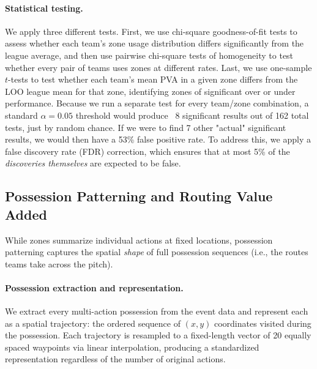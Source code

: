 \documentclass[12pt,a4paper]{article}
\begin{document}
\paragraph{Statistical testing.}
We apply three different tests. First, we use chi-square goodness-of-fit tests to assess whether each team’s zone usage distribution differs significantly from the league average, and then use pairwise chi-square tests of homogeneity to test whether every pair of teams uses zones at different rates. Last, we use one-sample $t$-tests to test whether each team’s mean PVA in a given zone differs from the LOO league mean for that zone, identifying zones of significant over or under performance. Because we run a separate test for every team/zone combination, a standard $\alpha = 0.05$ threshold would produce ~8 significant results out of 162 total tests, just by random chance. If we were to find 7 other "actual" significant results, we would then have a 53\% false positive rate. To address this, we apply a false discovery rate (FDR) correction, which ensures that at most 5\% of the \emph{discoveries themselves} are expected to be false.

\subsection{Possession Patterning and Routing Value Added}
While zones summarize individual actions at fixed locations, possession patterning captures the spatial \emph{shape} of full possession sequences (i.e., the routes teams take across the pitch).

\paragraph{Possession extraction and representation.}
We extract every multi-action possession from the event data and represent each as a spatial trajectory: the ordered sequence of $(x, y)$ coordinates visited during the possession. Each trajectory is resampled to a fixed-length vector of 20 equally spaced waypoints via linear interpolation, producing a standardized representation regardless of the number of original actions.
\end{document}
